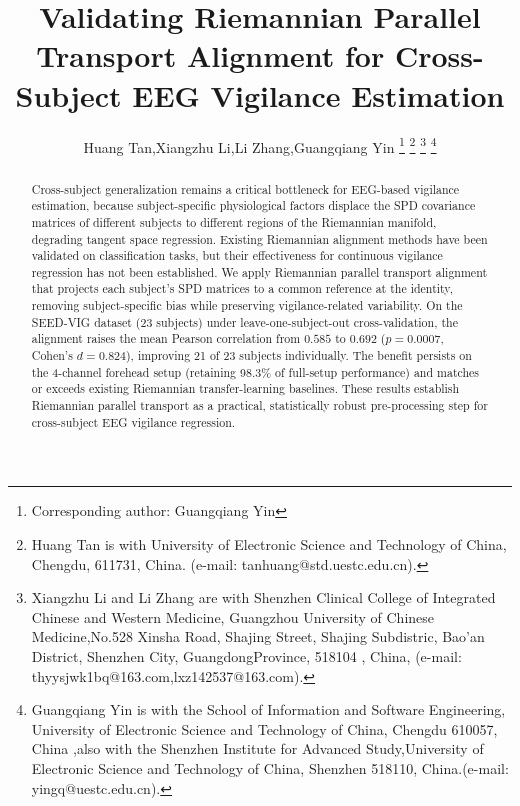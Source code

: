 \documentclass[journal,twoside,web]{ieeecolor2}
\begin{document}
\title{Validating Riemannian Parallel Transport Alignment for Cross-Subject EEG Vigilance Estimation}

\author{{Huang Tan,Xiangzhu Li,Li Zhang,Guangqiang Yin}
\thanks{Corresponding author: Guangqiang Yin}
\thanks{Huang Tan is with University of Electronic Science and Technology of China, Chengdu, 611731, China. (e-mail: tanhuang@std.uestc.edu.cn).}
\thanks{Xiangzhu Li and Li Zhang are with Shenzhen Clinical College of Integrated Chinese and Western Medicine, Guangzhou University of Chinese Medicine,No.528 Xinsha Road, Shajing Street, Shajing Subdistric, Bao'an District, Shenzhen City, GuangdongProvince, 518104 , China,  (e-mail: thyysjwk1bq@163.com,lxz142537@163.com).}
\thanks{Guangqiang Yin is with the School of Information and Software Engineering, University of Electronic Science and Technology of China, Chengdu 610057, China ,also with the Shenzhen Institute for Advanced Study,University of Electronic Science and Technology of China, Shenzhen 518110, China.(e-mail: yingq@uestc.edu.cn).}
}

\maketitle

\begin{abstract}
Cross-subject generalization remains a critical bottleneck for EEG-based
vigilance estimation, because subject-specific physiological factors
displace the SPD covariance matrices of different subjects to different
regions of the Riemannian manifold, degrading tangent space regression.
Existing Riemannian alignment methods have been validated on classification
tasks, but their effectiveness for continuous vigilance regression has not
been established. We apply Riemannian parallel transport alignment that
projects each subject's SPD matrices to a common reference at the identity,
removing subject-specific bias while preserving vigilance-related
variability. On the SEED-VIG dataset (23 subjects) under leave-one-subject-out
cross-validation, the alignment raises the mean Pearson correlation from
$0.585$ to $0.692$ ($p = 0.0007$, Cohen's $d = 0.824$), improving 21 of 23
subjects individually. The benefit persists on the 4-channel forehead setup
(retaining 98.3\% of full-setup performance) and matches or exceeds existing
Riemannian transfer-learning baselines. These results establish Riemannian
parallel transport as a practical, statistically robust pre-processing step
for cross-subject EEG vigilance regression.
\end{abstract}
\end{document}
